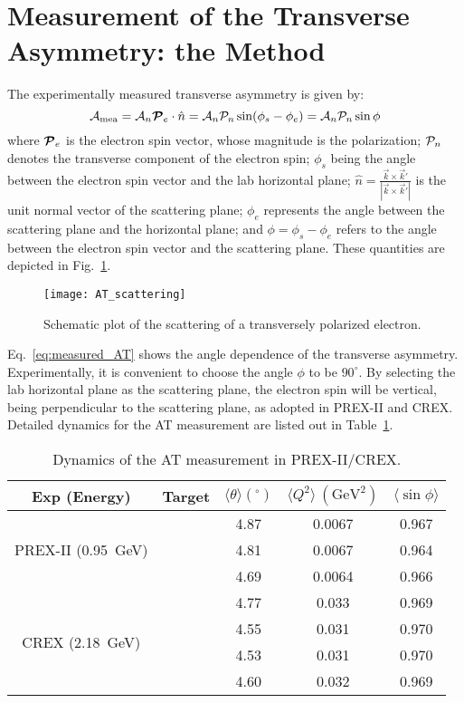 \section{Measurement of the Transverse Asymmetry: the Method}
The experimentally measured transverse asymmetry is given by:
\begin{equation}
    \mathcal{A}_{\text{mea}} = \mathcal{A}_n \boldsymbol{\mathcal{P}}_e \cdot \hat{n} = \mathcal{A}_n \mathcal{P}_n \sin(\phi_s - \phi_e) = \mathcal{A}_n \mathcal{P}_n \sin\phi
    \label{eq:measured_AT}
\end{equation}
where $\boldsymbol{\mathcal{P}}_e$ is the electron spin vector, whose magnitude is the polarization;
$\mathcal{P}_n$ denotes the transverse component of the electron spin;
$\phi_s$ being the angle between the electron spin vector and the lab horizontal plane;
$\hat{n} = \frac{\vec{k} \times \vec{k}'}{|\vec{k} \times \vec{k}'|}$ 
is the unit normal vector of the scattering plane;
$\phi_e$ represents the angle between the scattering plane and the horizontal plane;
and $\phi = \phi_s - \phi_e$ refers to the angle between the electron spin vector 
and the scattering plane.
These quantities are depicted in Fig.~\ref{fig:AT_scattering}.
\begin{figure}[h!]
    \centering
    \texttt{[image: AT\_scattering]}
    \caption{Schematic plot of the scattering of a transversely polarized electron.}
    \label{fig:AT_scattering}
\end{figure}

Eq.~\ref{eq:measured_AT} shows the angle dependence of the transverse asymmetry. 
Experimentally, it is convenient to choose the angle $\phi$ to be $90^\circ$. 
By selecting the lab horizontal plane as the scattering plane, the electron spin will
be vertical, being perpendicular to the scattering plane, as adopted in PREX-II and CREX. 
Detailed dynamics for the AT measurement are listed out in Table~\ref{tab:AT_dynamics}.

\begin{table}
    \centering
    \begin{tabular}{c c | c c c}
	\hline
	Exp (Energy)	& Target    & $\langle \theta \rangle ({}^\circ)$   & $\langle Q^2 \rangle \ (\mathrm{GeV}^2)$	& $\langle \sin\phi \rangle$	\\
	\hline
	\multirow{3}{*}{PREX-II (0.95~GeV)}
	    & \Carbon    & 4.87  & 0.0067    & 0.967 \\ 
	    & \ca   & 4.81  & 0.0067    & 0.964 \\ 
	    & \Pb   & 4.69  & 0.0064    & 0.966 \\ 
	\hline
	\multirow{4}{*}{CREX (2.18~GeV)}
	    & \Carbon    & 4.77  & 0.033	& 0.969 \\ 
	    & \ca   & 4.55  & 0.031	& 0.970 \\ 
	    & \Ca   & 4.53  & 0.031     & 0.970 \\ 
	    & \Pb   & 4.60  & 0.032     & 0.969 \\ 
	\hline
    \end{tabular}
    \caption{Dynamics of the AT measurement in PREX-II/CREX.}
    \label{tab:AT_dynamics}
\end{table}

